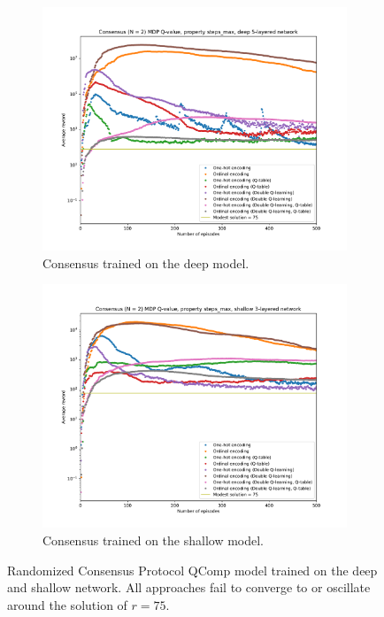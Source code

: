 \begin{figure}
    \centering
    \begin{subfigure}[b]{0.9\textwidth}
        \centering
        \includegraphics[width=\textwidth]{plot/consensus.2-steps_max-q.pdf}
        \caption{Consensus trained on the deep model.}
        \label{fig:consensus.2-steps_max-deep-q}
    \end{subfigure}
    \vfill
    \begin{subfigure}[b]{0.9\textwidth}
        \centering
        \includegraphics[width=\textwidth]{plot/consensus.2-steps_max-fc128-q.pdf}
        \caption{Consensus trained on the shallow model.}
        \label{fig:consensus.2-steps_max-shallow-q}
    \end{subfigure}
    \caption{Randomized Consensus Protocol QComp model trained on the deep and shallow network. All approaches fail to converge to or oscillate around the solution of $r = 75$.}
    \label{fig:consensus.2-steps_max-q}
\end{figure}

